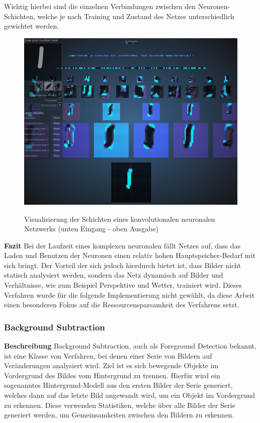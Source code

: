 Wichtig hierbei sind die einzelnen Verbindungen zwischen den Neuronen-Schichten, welche je nach Training und Zustand des Netzes unterschiedlich gewichtet werden.
\begin{figure}[ht]
   \centering
     \includegraphics[width=15cm]{Bilder/cnn-visualized} \\
 \caption{Visualisierung der Schichten eines konvolutionalen neuronalen Netzwerks (unten Eingang - oben Ausgabe)}
 \label{fig:CNN}
\end{figure}
\newline\newline
\textbf{Fazit}\newline
Bei der Laufzeit eines komplexen neuronalen fällt Netzes auf, dass das Laden und Benutzen der Neuronen einen relativ hohen Hauptspeicher-Bedarf mit sich bringt.
Der Vorteil der sich jedoch hierdurch bietet ist, dass Bilder nicht statisch analysiert werden, sondern das Netz dynamisch auf Bilder und Verhältnisse, wie zum Beispiel Perspektive und Wetter, trainiert wird.
Dieses Verfahren wurde für die folgende Implementierung nicht gewählt, da diese Arbeit einen besonderen Fokus auf die Ressourcensparsamkeit des Verfahrens setzt.
\newpage

\subsubsection{Background Subtraction}
\label{sec:backsub-algo}
\textbf{Beschreibung}\newline
Background Subtraction, auch als Foreground Detection bekannt, ist eine Klasse von Verfahren, bei denen einer Serie von Bildern auf Veränderungen analysiert wird.
Ziel ist es sich bewegende Objekte im Vordergrund des Bildes vom Hintergrund zu trennen.
Hierfür wird ein sogenanntes Hintergrund-Modell aus den ersten Bilder der Serie generiert, welches dann auf das letzte Bild angewandt wird, um ein Objekt im Vordergrund zu erkennen. 
Diese verwenden Statistiken, welche über alle Bilder der Serie generiert werden, um Gemeinsamkeiten zwischen den Bildern zu erkennen.

